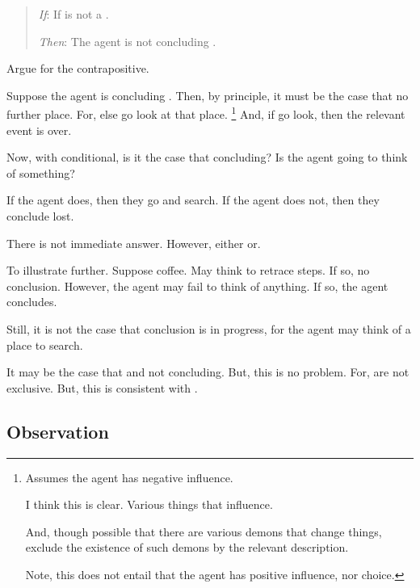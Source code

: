 \begin{note}
  \begin{quote}
    \begin{itenum}
    \item[\emph{If}:]
      If  is not a \fc{}.
    \item[\emph{Then}:]
      The agent is not concluding .
    \end{itenum}
  \end{quote}

  Argue for the contrapositive.

  Suppose the agent is concluding .
  Then, by principle, it must be the case that no further place.
  For, else go look at that place.%
  \footnote{
    Assumes the agent has negative influence.

    I think this is clear.
    Various things that influence.

    And, though possible that there are various demons that change things, exclude the existence of such demons by the relevant description.

    Note, this does not entail that the agent has positive influence, nor choice.
  }
  And, if go look, then the relevant event is over.

  Now, with conditional, is it the case that concluding?
  Is the agent going to think of something?

  If the agent does, then they go and search.
  If the agent does not, then they conclude lost.

  There is not immediate answer.
  However, either or.

  To illustrate further.
  Suppose coffee.
  May think to retrace steps.
  If so, no conclusion.
  However, the agent may fail to think of anything.
  If so, the agent concludes.

  Still, it is not the case that conclusion is in progress, for the agent may think of a place to search.

  It may be the case that \fc{} and not concluding.
  But, this is no problem.
  For,  are not exclusive.
  But, this is consistent with \requ{}.
\end{note}



\subsection{Observation}
\label{cha:requs:def:obs}

